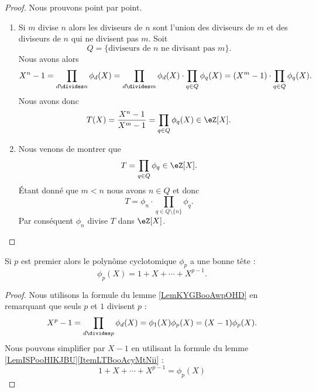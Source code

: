 \begin{proof}
    Nous prouvons point par point.
    \begin{enumerate}
        \item
            Si \( m\) divise \( n\) alors les diviseurs de \( n\) sont l'union des diviseurs de \( m\) et des diviseurs de \( n\) qui ne divisent pas \( m\). Soit
            \begin{equation}
                Q=\{\text{diviseurs de } n\text{ ne divisant pas } m \}.
            \end{equation}
            Nous avons alors
            \begin{equation}
                X^n-1=\prod_{d\divides n}\phi_d(X)=\prod_{d\divides m}\phi_d(X)\cdot\prod_{q\in Q}\phi_q(X)=(X^m-1)\cdot\prod_{q\in Q}\phi_q(X).
            \end{equation}
            Nous avons donc
            \begin{equation}
                T(X)=\frac{ X^n-1 }{ X^m-1 }=\prod_{q\in Q}\phi_q(X)\in \eZ[X].
            \end{equation}
            
        \item

            Nous venons de montrer que
            \begin{equation}
                T=\prod_{q\in Q}\phi_q\in \eZ[X].
            \end{equation}
            Étant donné que \( m<n\) nous avons \( n\in Q\) et donc
            \begin{equation}
                T=\phi_n\cdot\prod_{q\in Q\setminus\{ n \}}\phi_q.
            \end{equation}
            Par conséquent \( \phi_n\) divise \( T\) dans \( \eZ[X]\).
        \end{enumerate}
\end{proof}

\begin{corollary}   \label{CorTVUooErJiAC}
    Si \( p\) est premier alors le polynôme cyclotomique \( \phi_p\) a une bonne tête :
    \begin{equation}
        \phi_p(X)=1+X+\cdots +X^{p-1}.
    \end{equation}
\end{corollary}

\begin{proof}
    Nous utilisons la formule du lemme \ref{LemKYGBooAwpOHD} en remarquant que seuls \( p\) et \( 1\) divisent \( p\) :
    \begin{equation}
        X^p-1=\prod_{d\divides p}\phi_d(X)=\phi_1(X)\phi_p(X)=(X-1)\phi_p(X).
    \end{equation}
    Nous pouvons simplifier par \( X-1\) en utilisant la formule du lemme \ref{LemISPooHIKJBU}\ref{ItemLTBooAcyMtNii} :
    \begin{equation}
        1+X+\cdots +X^{p-1}=\phi_p(X)
    \end{equation}
\end{proof}

